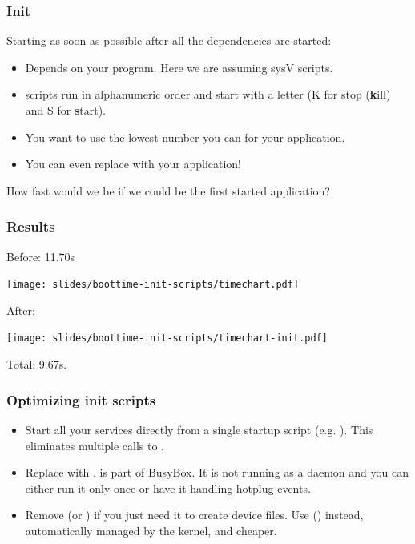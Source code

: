 \begin{frame}
\frametitle{Init}
Starting as soon as possible after all the dependencies are started:
\begin{itemize}
	\item Depends on your  program. Here we are assuming sysV
	       scripts.
	\item {} scripts run in alphanumeric order and start with
	      a letter (K for stop ({\bf k}ill) and S for {\bf s}tart).
	\item You want to use the lowest number you can for your application.
	\item You can even replace  with your application!
\end{itemize}
How fast would we be if we could be the first started application?
\end{frame}

\begin{frame}
\frametitle{Results}
Before: 11.70s
\begin{center}
    \texttt{[image: slides/boottime-init-scripts/timechart.pdf]}
\end{center}
After:
\begin{center}
    \texttt{[image: slides/boottime-init-scripts/timechart-init.pdf]}
\end{center}
Total: 9.67s.
\end{frame}

\begin{frame}
\frametitle{Optimizing init scripts}
\begin{itemize}
	\item Start all your services directly from a single startup
	      script (e.g. ). This eliminates multiple
	      calls to .
	\item Replace  with .  is part of
	      BusyBox. It is not running as a daemon and you can either run it
   	      only once or have it handling hotplug events.
	\item Remove  (or ) if you just need it
	      to create device files.  Use 
	      () instead, automatically managed by the
	      kernel, and cheaper.
\end{itemize}
\end{frame}

